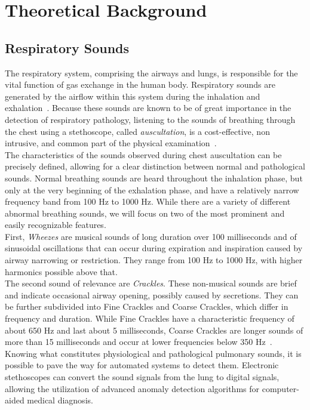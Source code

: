 \cleardoubleoddpage%
\chapter{Theoretical Background}

\section{Respiratory Sounds}
\label{theory:sounds}
The respiratory system, comprising the airways and lungs, is responsible for the vital function of gas exchange in the human body. Respiratory sounds are generated by the airflow within this system during the inhalation and exhalation~\cite{earis1992lung}. Because these sounds are known to be of great importance in the detection of respiratory pathology, listening to the sounds of breathing through the chest using a stethoscope, called \textit{auscultation}, is a cost-effective, non intrusive, and common part of the physical examination~\cite{bohadana2014fundamentals}. \\
The characteristics of the sounds observed during chest auscultation can be precisely defined, allowing for a clear distinction between normal and pathological sounds. Normal breathing sounds are heard throughout the inhalation phase, but only at the very beginning of the exhalation phase, and have a relatively narrow frequency band from 100 Hz to 1000 Hz. While there are a variety of different abnormal breathing sounds, we will focus on two of the most prominent and easily recognizable features.\\
First, \textit{Wheezes} are musical sounds of long duration over 100 milliseconds and of sinusoidal oscillations that can occur during expiration and inspiration caused by airway narrowing or restriction. They range from 100 Hz to 1000 Hz, with higher harmonics possible above that.\\
The second sound of relevance are \textit{Crackles}. These non-musical sounds are brief and indicate occasional airway opening, possibly caused by secretions. They can be further subdivided into Fine Crackles and Coarse Crackles, which differ in frequency and duration. While Fine Crackles have a characteristic frequency of about 650 Hz and last about 5 milliseconds, Coarse Crackles are longer sounds of more than 15 milliseconds and occur at lower frequencies below 350 Hz~\cite{bohadana2014fundamentals}. \\
Knowing what constitutes physiological and pathological pulmonary sounds, it is possible to pave the way for automated systems to detect them. Electronic stethoscopes can convert the sound signals from the lung to digital signals, allowing the utilization of advanced anomaly detection algorithms for computer-aided medical diagnosis.

